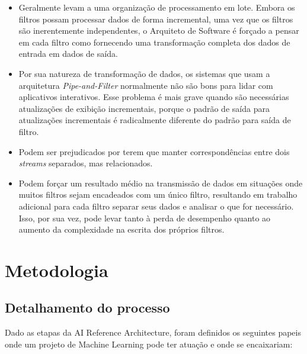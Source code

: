 \documentclass[portugues]{ic-tese}
\begin{document}
\begin{itemize}
\item Geralmente levam a uma organização de processamento em lote. Embora os filtros possam processar dados de forma incremental, uma vez que os filtros são inerentemente independentes, o Arquiteto de Software é forçado a pensar em cada filtro como fornecendo uma transformação completa dos dados de entrada em dados de saída. 
\item Por sua natureza de transformação de dados, os sistemas que usam a arquitetura \textit{Pipe-and-Filter} normalmente não são bons para lidar com aplicativos interativos. Esse problema é mais grave quando são necessárias atualizações de exibição incrementais, porque o padrão de saída para atualizações incrementais é radicalmente diferente do padrão para saída de filtro.
\item Podem ser prejudicados por terem que manter correspondências entre dois \textit{streams} separados, mas relacionados. 
\item Podem forçar um resultado médio na transmissão de dados em situações onde muitos filtros sejam encadeados com um único filtro, resultando em trabalho adicional para cada filtro separar seus dados e analisar o que for necessário. Isso, por sua vez, pode levar tanto à perda de desempenho quanto ao aumento da complexidade na escrita dos próprios filtros.
\end{itemize}

\chapter{Metodologia}
\label{sec:metodologia}

\section{Detalhamento do processo}

Dado as etapas da AI Reference Architecture, foram definidos os seguintes papeis onde um projeto de Machine Learning pode ter atuação e onde se encaixariam:
\end{document}
